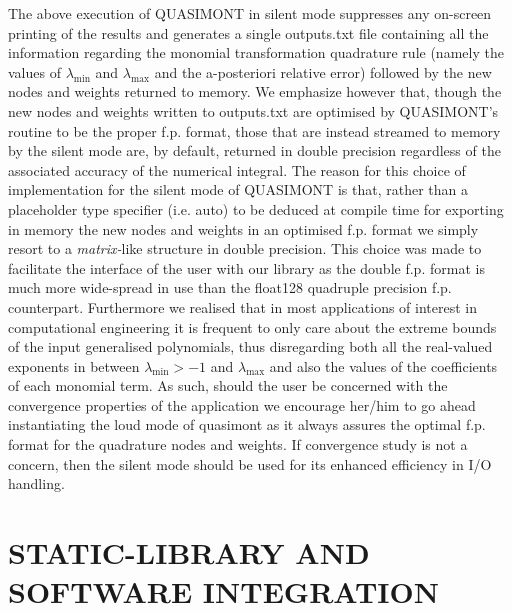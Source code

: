 \documentclass[a4paper, twosided]{book}
\begin{document}
\noindent
The above execution of QUASIMONT in silent mode suppresses any on-screen printing of the results and generates a single \colorbox{poliGrayBlue}{outputs.txt} file containing all the information regarding the monomial transformation quadrature rule (namely the values of $\lambda_{\text{min}}$ and $\lambda_{\text{max}}$ and the a-posteriori relative error) followed by the new nodes and weights returned to memory. We emphasize however that, though the new nodes and weights written to \colorbox{poliGrayBlue}{outputs.txt} are optimised by QUASIMONT's routine to be the proper f.p. format, those that are instead streamed to memory by the silent mode are, by default, returned in \colorbox{poliGrayBlue}{double} precision regardless of the associated accuracy of the numerical integral. The reason for this choice of implementation for the silent mode of QUASIMONT is that, rather than a placeholder type specifier (i.e. \colorbox{poliGrayBlue}{auto}) to be deduced at compile time for exporting in memory the new nodes and weights in an optimised f.p. format we simply resort to a {\itshape matrix-}like structure in \colorbox{poliGrayBlue}{double} precision. This choice was made to facilitate the interface of the user with our library as the \colorbox{poliGrayBlue}{double} f.p. format is much more wide-spread in use than the \colorbox{poliGrayBlue}{float128} quadruple precision f.p. counterpart. Furthermore we realised that in most applications of interest in computational engineering it is frequent to only care about the extreme bounds of the input generalised polynomials, thus disregarding both all the real-valued exponents in between $\lambda_{\text{min}}>-1$ and $\lambda_{\text{max}}$ and also the values of the coefficients of each monomial term. As such, should the user be concerned with the convergence properties of the application we encourage her/him to go ahead instantiating the loud mode of \colorbox{poliGrayBlue}{quasimont} as it always assures the optimal f.p. format for the quadrature nodes and weights. If convergence study is not a concern, then the silent mode should be used for its enhanced efficiency in I/O handling.

\newpage
\section[Static-library and software integration]{\changefont STATIC-LIBRARY AND SOFTWARE INTEGRATION}\label{Sec3.3}
\end{document}
